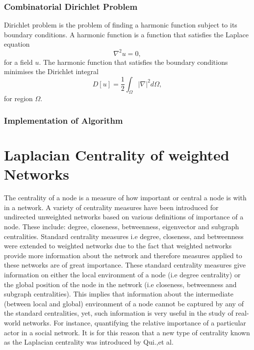 \documentclass[10pt,a4paper]{article}
\begin{document}
\subsubsection {Combinatorial Dirichlet Problem}
Dirichlet problem is the problem of finding a harmonic function subject to its boundary conditions. A harmonic function is a function that satisfies the Laplace equation
\begin{equation}
\nabla^2 u = 0,
\end{equation}
for a field $u$. The harmonic function that satisfies the boundary conditions minimises the Dirichlet integral
\begin{equation}
D[u]= \frac{1}{2} \int_{\Omega} |\nabla|^2 d\Omega,
\end{equation}
for region $\Omega$.
\subsubsection{Implementation of Algorithm}

\newpage
\section{Laplacian Centrality of weighted Networks}
The centrality of a node is a measure of how important or central a node is with in a network. A variety of centrality measures have been introduced for undirected unweighted networks based on various definitions of importance of a node. These include: degree, closeness, betweenness, eigenvector and subgraph centralities. Standard centrality measures i.e degree, closeness, and betweenness  were extended to weighted networks due to the fact that weighted networks provide more information about the network and therefore measures applied to these networks are of great importance.
These standard centrality measures give information on either the local environment of a node (i.e degree centrality) or the global position of the node in the network (i.e closeness, betweenness and subgraph centralities). This implies that information about the intermediate (between local and global) environment of a node cannot be captured by any of the standard centralities, yet, such information is very useful in the study of real-world networks. For instance, quantifying the relative importance of a particular actor in a social network. It is for this reason that a new type of centrality known as the Laplacian centrality was introduced by Qui.,et al. %
\end{document}
